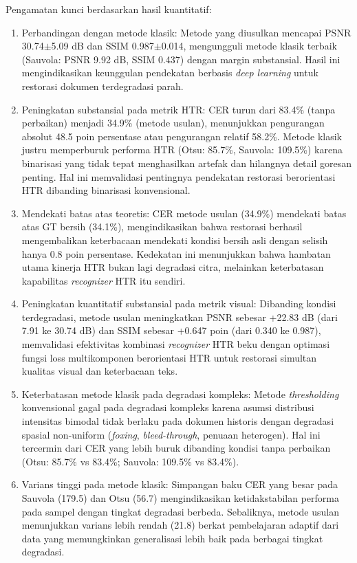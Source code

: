 \documentclass[journal]{IEEEtran}
\begin{document}
Pengamatan kunci berdasarkan hasil kuantitatif:
\begin{enumerate}
    \item Perbandingan dengan metode klasik: Metode yang diusulkan mencapai PSNR 30.74$\pm$5.09 dB dan SSIM 0.987$\pm$0.014, mengungguli metode klasik terbaik (Sauvola: PSNR 9.92 dB, SSIM 0.437) dengan margin substansial. Hasil ini mengindikasikan keunggulan pendekatan berbasis \textit{deep learning} untuk restorasi dokumen terdegradasi parah.
    
    \item Peningkatan substansial pada metrik HTR: CER turun dari 83.4\% (tanpa perbaikan) menjadi 34.9\% (metode usulan), menunjukkan pengurangan absolut 48.5 poin persentase atau pengurangan relatif 58.2\%. Metode klasik justru memperburuk performa HTR (Otsu: 85.7\%, Sauvola: 109.5\%) karena binarisasi yang tidak tepat menghasilkan artefak dan hilangnya detail goresan penting. Hal ini memvalidasi pentingnya pendekatan restorasi berorientasi HTR dibanding binarisasi konvensional.
    
    \item Mendekati batas atas teoretis: CER metode usulan (34.9\%) mendekati batas atas GT bersih (34.1\%), mengindikasikan bahwa restorasi berhasil mengembalikan keterbacaan mendekati kondisi bersih asli dengan selisih hanya 0.8 poin persentase. Kedekatan ini menunjukkan bahwa hambatan utama kinerja HTR bukan lagi degradasi citra, melainkan keterbatasan kapabilitas \textit{recognizer} HTR itu sendiri.
    
    \item Peningkatan kuantitatif substansial pada metrik visual: Dibanding kondisi terdegradasi, metode usulan meningkatkan PSNR sebesar +22.83 dB (dari 7.91 ke 30.74 dB) dan SSIM sebesar +0.647 poin (dari 0.340 ke 0.987), memvalidasi efektivitas kombinasi \textit{recognizer} HTR beku dengan optimasi fungsi loss multikomponen berorientasi HTR untuk restorasi simultan kualitas visual dan keterbacaan teks.
    
    \item Keterbatasan metode klasik pada degradasi kompleks: Metode \textit{thresholding} konvensional gagal pada degradasi kompleks karena asumsi distribusi intensitas bimodal tidak berlaku pada dokumen historis dengan degradasi spasial non-uniform (\textit{foxing}, \textit{bleed-through}, penuaan heterogen). Hal ini tercermin dari CER yang lebih buruk dibanding kondisi tanpa perbaikan (Otsu: 85.7\% vs 83.4\%; Sauvola: 109.5\% vs 83.4\%).
    
    \item Varians tinggi pada metode klasik: Simpangan baku CER yang besar pada Sauvola (179.5) dan Otsu (56.7) mengindikasikan ketidakstabilan performa pada sampel dengan tingkat degradasi berbeda. Sebaliknya, metode usulan menunjukkan varians lebih rendah (21.8) berkat pembelajaran adaptif dari data yang memungkinkan generalisasi lebih baik pada berbagai tingkat degradasi.
\end{enumerate}
\end{document}
